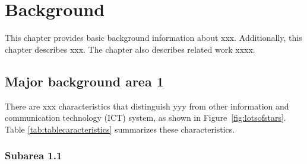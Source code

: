\chapter{Background}
\label{ch:background}


This chapter provides basic background information about xxx. Additionally, this chapter describes xxx. The chapter also describes related work xxxx.


\section{Major background area 1}


There are xxx characteristics that distinguish yyy from other information and communication technology (ICT) system, as shown in Figure~\ref{fig:lotsofstars}. Table \ref{tab:tablecaracteristics} summarizes these characteristics.










\subsection{Subarea 1.1}


